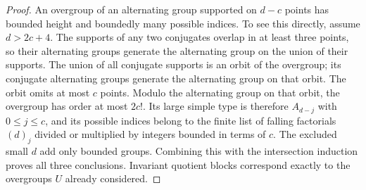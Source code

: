 \begin{proof}
An overgroup of an alternating group supported on $d-c$ points has
bounded height and boundedly many possible indices.  To see this
directly, assume $d>2c+4$.  The supports of any two conjugates overlap
in at least three points, so their alternating groups generate the
alternating group on the union of their supports.  The union of
all conjugate supports is an orbit of the overgroup; its conjugate
alternating groups generate the alternating group on that orbit.
The orbit omits at most $c$ points.  Modulo the
alternating group on that orbit, the overgroup has order at most
$2c!$.  Its large simple type is therefore $A_{d-j}$ with
$0\leq j\leq c$, and its possible indices belong to the finite list
of falling factorials $(d)_j$ divided or multiplied by integers
bounded in terms of $c$.  The excluded small $d$ add only bounded
groups.  Combining this with the intersection induction proves
all three conclusions.  Invariant quotient blocks correspond
exactly to the overgroups $U$ already considered.
\end{proof}

